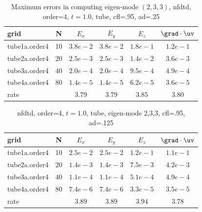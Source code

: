 \begin{table}[hbt]
\begin{center}
\begin{tabular}{|l|c|c|c|c|c|} \hline\hline 
grid  & N &  $E_x$ &  $E_y$ & $E_z$ & $\grad\cdot\uv$\\ \hline 
       tube1a.order4 &    10 &$3.8 e-2$ &$3.8 e-2$ &$1.8 e-1$ &$1.2 e-1$  \\ \hline
       tube2a.order4 &    20 &$2.5 e-3$ &$2.5 e-3$ &$1.4 e-2$ &$3.6 e-3$  \\ \hline
       tube3a.order4 &    40 &$2.0 e-4$ &$2.0 e-4$ &$9.5 e-4$ &$4.9 e-4$  \\ \hline
       tube4a.order4 &    80 &$1.4 e-5$ &$1.4 e-5$ &$6.2 e-5$ &$3.6 e-5$  \\ \hline
    rate            &     &       $3.79$ &       $3.79$ &       $3.85$ &       $3.80$  \\ \hline\hline
\end{tabular}
\caption{Maximum errors in computing eigen-mode $(2,3,3)$,
          nfdtd, order=$4$, $t=1.0$, tube,  cfl=.95, ad=.25 }\label{table:mx.tube}
\end{center}
\end{table}

\begin{table}[hbt]
\begin{center}
\begin{tabular}{|l|c|c|c|c|c|} \hline\hline 
grid  & N &  $E_x$ &  $E_y$ & $E_z$ & $\grad\cdot\uv$\\ \hline 
       tube1a.order4 &    10 &$2.5 e-2$ &$2.5 e-2$ &$1.2 e-1$ &$1.1 e-1$  \\ \hline
       tube2a.order4 &    20 &$1.4 e-3$ &$1.4 e-3$ &$7.5 e-3$ &$4.2 e-3$  \\ \hline
       tube3a.order4 &    40 &$1.1 e-4$ &$1.1 e-4$ &$5.1 e-4$ &$4.9 e-4$  \\ \hline
       tube4a.order4 &    80 &$7.4 e-6$ &$7.4 e-6$ &$3.3 e-5$ &$3.5 e-5$  \\ \hline
    rate            &     &       $3.89$ &       $3.89$ &       $3.94$ &       $3.78$  \\ \hline\hline
\end{tabular}
\caption{nfdtd, order=$4$, $t=1.0$, tube, eigen-mode 2,3,3, cfl=.95, ad=.125}\label{table:mx.tube}
\end{center}
\end{table}

